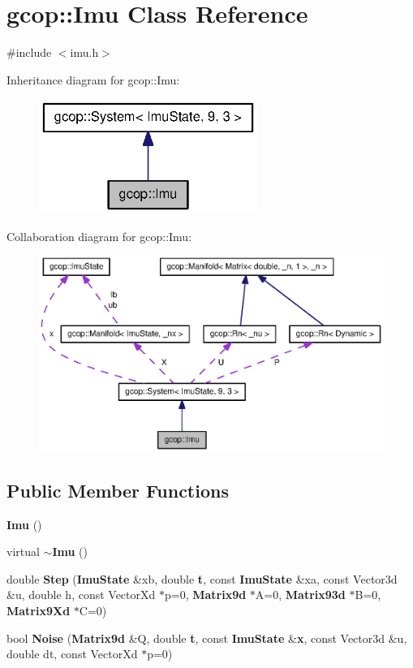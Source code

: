 \section{gcop\-:\-:\-Imu \-Class \-Reference}
\label{classgcop_1_1Imu}


{\ttfamily \#include $<$imu.\-h$>$}



\-Inheritance diagram for gcop\-:\-:\-Imu\-:\nopagebreak
\begin{figure}[H]
\begin{center}
\leavevmode
\includegraphics[width=202pt]{classgcop_1_1Imu__inherit__graph}
\end{center}
\end{figure}


\-Collaboration diagram for gcop\-:\-:\-Imu\-:\nopagebreak
\begin{figure}[H]
\begin{center}
\leavevmode
\includegraphics[width=350pt]{classgcop_1_1Imu__coll__graph}
\end{center}
\end{figure}
\subsection*{\-Public \-Member \-Functions}
\begin{DoxyCompactItemize}
\item 
{\bf \-Imu} ()
\item 
virtual {\bf $\sim$\-Imu} ()
\item 
double {\bf \-Step} ({\bf \-Imu\-State} \&xb, double {\bf t}, const {\bf \-Imu\-State} \&xa, const \-Vector3d \&u, double h, const \-Vector\-Xd $\ast$p=0, {\bf \-Matrix9d} $\ast$\-A=0, {\bf \-Matrix93d} $\ast$\-B=0, {\bf \-Matrix9\-Xd} $\ast$\-C=0)
\item 
bool {\bf \-Noise} ({\bf \-Matrix9d} \&\-Q, double {\bf t}, const {\bf \-Imu\-State} \&{\bf x}, const \-Vector3d \&u, double dt, const \-Vector\-Xd $\ast$p=0)
\end{DoxyCompactItemize}
